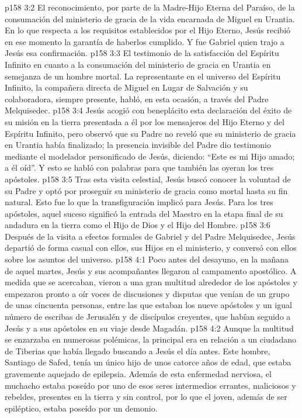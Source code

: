 \vs p158 3:2 El reconocimiento, por parte de la Madre\hyp{}Hijo Eterna del Paraíso, de la consumación del ministerio de gracia de la vida encarnada de Miguel en Urantia. En lo que respecta a los requisitos establecidos por el Hijo Eterno, Jesús recibió en ese momento la garantía de haberlos cumplido. Y fue Gabriel quien trajo a Jesús esa confirmación.
\vs p158 3:3 El testimonio de la satisfacción del Espíritu Infinito en cuanto a la consumación del ministerio de gracia en Urantia en semejanza de un hombre mortal. La representante en el universo del Espíritu Infinito, la compañera directa de Miguel en Lugar de Salvación y su colaboradora, siempre presente, habló, en esta ocasión, a través del Padre Melquisedec.
\vs p158 3:4 \pc Jesús acogió con beneplácito esta declaración del éxito de su misión en la tierra presentada a él por los mensajeros del Hijo Eterno y del Espíritu Infinito, pero observó que su Padre no reveló que su ministerio de gracia en Urantia había finalizado; la presencia invisible del Padre dio testimonio mediante el modelador personificado de Jesús, diciendo: “Este es mi Hijo amado; a él oíd”. Y esto se habló con palabras para que también las oyeran los tres apóstoles.
\vs p158 3:5 Tras esta visita celestial, Jesús buscó conocer la voluntad de su Padre y optó por proseguir su ministerio de gracia como mortal hasta su fin natural. Esto fue lo que la transfiguración implicó para Jesús. Para los tres apóstoles, aquel suceso significó la entrada del Maestro en la etapa final de su andadura en la tierra como el Hijo de Dios y el Hijo del Hombre.
\vs p158 3:6 Después de la visita a efectos formales de Gabriel y del Padre Melquisedec, Jesús departió de forma casual con ellos, sus Hijos en el ministerio, y conversó con ellos sobre los asuntos del universo.
\vs p158 4:1 Poco antes del desayuno, en la mañana de aquel martes, Jesús y sus acompañantes llegaron al campamento apostólico. A medida que se acercaban, vieron a una gran multitud alrededor de los apóstoles y empezaron pronto a oír voces de discusiones y disputas que venían de un grupo de unas cincuenta personas, entre las que estaban los nueve apóstoles y un igual número de escribas de Jerusalén y de discípulos creyentes, que habían seguido a Jesús y a sus apóstoles en su viaje desde Magadán.
\vs p158 4:2 Aunque la multitud se enzarzaba en numerosas polémicas, la principal era en relación a un ciudadano de Tiberias que había llegado buscando a Jesús el día antes. Este hombre, Santiago de Safed, tenía un único hijo de unos catorce años de edad, que estaba gravemente aquejado de epilepsia. Además de esta enfermedad nerviosa, el muchacho estaba poseído por uno de esos seres intermedios errantes, maliciosos y rebeldes, presentes en la tierra y sin control, por lo que el joven, además de ser epiléptico, estaba poseído por un demonio.
